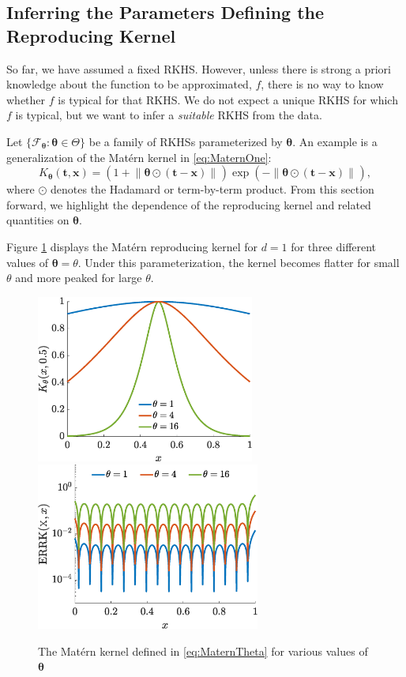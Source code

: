 \documentclass[]{mcom-l}
\theoremstyle{remark}
\newcommand{\bx}{{\boldsymbol{x}}}
\newcommand{\bt}{{\boldsymbol{t}}}
\newcommand{\btheta}{{\boldsymbol{\theta}}}
\newcommand{\calf}{{\mathcal{F}}}
\newcommand{\norm}[2][{}]{\ensuremath{\left \lVert #2 \right \rVert}_{#1}}
\begin{document}
\subsection{Inferring the Parameters Defining the Reproducing Kernel} \label{sec:adaptTheta}

So far, we have assumed a fixed RKHS.  However, unless there is strong a priori knowledge about the function to be approximated, $f$, there is no way to know whether $f$ is typical for  that RKHS.  We do not expect a unique RKHS for which $f$ is typical, but we want to infer a \emph{suitable} RKHS from the data.  

Let $\{\calf_{\btheta} : \btheta \in \Theta\}$ be a family of RKHSs parameterized by $\btheta$.  An example is a generalization of the Mat\'ern kernel  in \eqref{eq:MaternOne}:
\begin{equation} \label{eq:MaternTheta}
K_\btheta(\bt,\bx) = (1 +  \norm{\btheta \odot (\bt-\bx)}) \exp(-\norm{\btheta \odot (\bt-\bx)}),
\end{equation}
where $\odot$ denotes the Hadamard or term-by-term product.  From this section forward, we highlight the dependence of the reproducing kernel and related quantities on $\btheta$.

Figure \ref{fig:MaternThPlot} displays the Mat\'ern reproducing kernel for $d=1$ for three different values of $\btheta = \theta$.  Under this parameterization, the kernel becomes flatter for small $\theta$ and more peaked for large $\theta$.  

\begin{figure}[H]
	\centering
	\includegraphics[height = 5.5cm]{ProgramsImages/KthetaPlot.eps} \qquad
	\includegraphics[height = 5.5cm]{ProgramsImages/errKplotth.eps}
	\caption{The Mat\'ern kernel defined in \eqref{eq:MaternTheta} for various values of $\btheta$ \label{fig:MaternThPlot}}
\end{figure}
\end{document}
